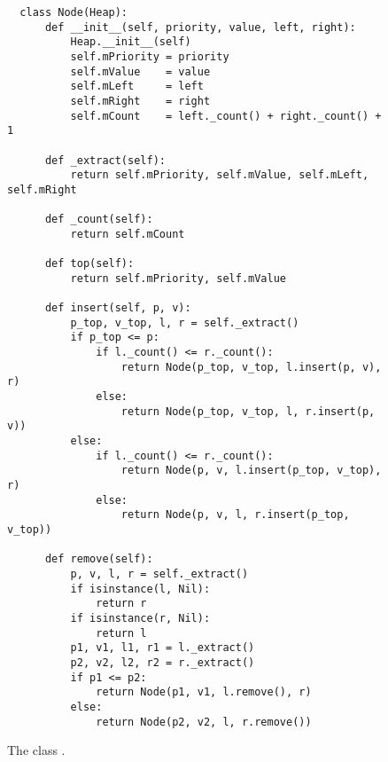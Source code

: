 \begin{figure}[!ht]
\centering
\begin{verbatim}
  class Node(Heap):
      def __init__(self, priority, value, left, right):
          Heap.__init__(self)
          self.mPriority = priority
          self.mValue    = value
          self.mLeft     = left
          self.mRight    = right
          self.mCount    = left._count() + right._count() + 1
          
      def _extract(self):
          return self.mPriority, self.mValue, self.mLeft, self.mRight
      
      def _count(self):
          return self.mCount
      
      def top(self):
          return self.mPriority, self.mValue
  
      def insert(self, p, v):
          p_top, v_top, l, r = self._extract()
          if p_top <= p:
              if l._count() <= r._count():
                  return Node(p_top, v_top, l.insert(p, v), r)
              else:
                  return Node(p_top, v_top, l, r.insert(p, v))
          else:
              if l._count() <= r._count():
                  return Node(p, v, l.insert(p_top, v_top), r)
              else:
                  return Node(p, v, l, r.insert(p_top, v_top))    
  
      def remove(self):
          p, v, l, r = self._extract()
          if isinstance(l, Nil):
              return r
          if isinstance(r, Nil):
              return l
          p1, v1, l1, r1 = l._extract()
          p2, v2, l2, r2 = r._extract()
          if p1 <= p2:
              return Node(p1, v1, l.remove(), r)
          else:
              return Node(p2, v2, l, r.remove())
\end{verbatim}
\vspace*{-0.3cm}
\caption{The class .}
\label{fig:Heap.ipynb:Node}
\end{figure}



